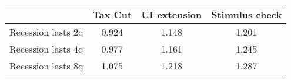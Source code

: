 \begin{tabular}{@{}lccc@{}} 
\toprule 
& Tax Cut    & UI extension    & Stimulus check    \\  \midrule 
Recession lasts 2q &0.924  & 1.148  & 1.201     \\ 
Recession lasts 4q &0.977  & 1.161  & 1.245     \\ 
Recession lasts 8q &1.075  & 1.218  & 1.287     \\ 
\end{tabular}  
